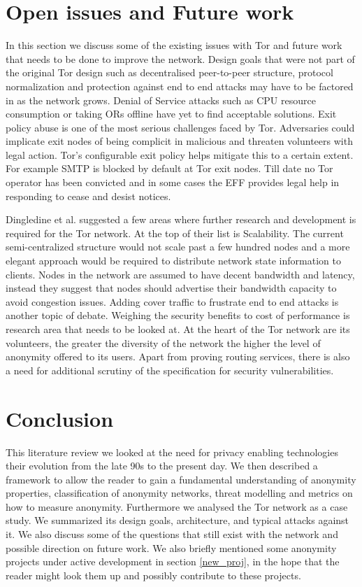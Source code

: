\documentclass{llncs}
\begin{document}
\section{Open issues and Future work} \label{openissues}
In this section we discuss some of the existing issues with Tor and future work that needs to be done to improve the network. Design goals that were not part of the original Tor design such as decentralised peer-to-peer structure, protocol normalization and protection against end to end attacks may have to be factored in as the network grows. Denial of Service attacks such as CPU resource consumption or taking ORs offline have yet to find acceptable solutions. Exit policy abuse is one of the most serious challenges faced by Tor. Adversaries could implicate exit nodes of being complicit in malicious and threaten volunteers with legal action. Tor's configurable exit policy helps mitigate this to a certain extent. For example SMTP is blocked by default at Tor exit nodes. Till date no Tor operator has been convicted and in some cases the EFF provides legal help in responding to cease and desist notices.

Dingledine et al. \cite{tor-design} suggested a few areas where further research and development is required for the Tor network. At the top of their list is Scalability. The current semi-centralized structure would not scale past a few hundred nodes and a more elegant approach would be required to distribute network state information to clients. Nodes in the network are assumed to have decent bandwidth and latency, instead they suggest that nodes should advertise their bandwidth capacity to avoid congestion issues. Adding cover traffic to frustrate end to end attacks is another topic of debate. Weighing the security benefits to cost of performance is research area that needs to be looked at.
At the heart of the Tor network are its volunteers, the greater the diversity of the network the higher the level of anonymity offered to its users. Apart from proving routing services, there is also a need for additional scrutiny of the specification for security vulnerabilities. 

\section{Conclusion} \label{conclusion}
This literature review we looked at the need for privacy enabling technologies their evolution from the late 90s to the present day. We then described a framework to allow the reader to gain a fundamental understanding of anonymity properties, classification of anonymity networks, threat modelling and metrics on how to measure anonymity.
Furthermore we analysed the Tor network as a case study. We summarized its design goals, architecture, and typical attacks against it. We also discuss some of the questions that still exist with the network and possible direction on future work.
We also briefly mentioned some anonymity projects under active development in section \ref{new_proj}, in the hope that the reader might look them up and possibly contribute to these projects.



\end{document}
